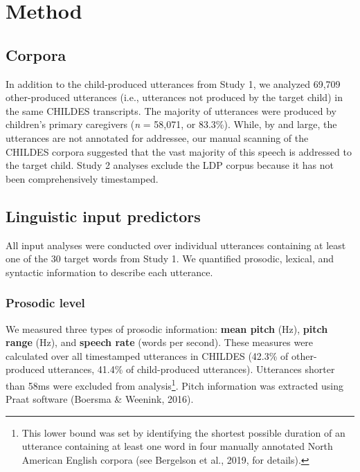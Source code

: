 \documentclass[10pt, letterpaper]{article}
\begin{document}
\vspace{\baselineskip} 
\vspace{\baselineskip}

\hypertarget{method-1}{%
\section{Method}\label{method-1}}

\hypertarget{corpora-1}{%
\subsection{Corpora}\label{corpora-1}}

In addition to the child-produced utterances from Study 1, we analyzed
69,709 other-produced utterances (i.e., utterances not produced by the
target child) in the same CHILDES transcripts. The majority of
utterances were produced by children's primary caregivers (\emph{n} =
58,071, or 83.3\%). While, by and large, the utterances are not
annotated for addressee, our manual scanning of the CHILDES corpora
suggested that the vast majority of this speech is addressed to the
target child. Study 2 analyses exclude the LDP corpus because it has not
been comprehensively timestamped.

\hypertarget{linguistic-input-predictors}{%
\subsection{Linguistic input
predictors}\label{linguistic-input-predictors}}

All input analyses were conducted over individual utterances containing
at least one of the 30 target words from Study 1. We quantified
prosodic, lexical, and syntactic information to describe each utterance.

\hypertarget{prosodic-level}{%
\subsubsection{Prosodic level}\label{prosodic-level}}

We measured three types of prosodic information: \textbf{mean pitch}
(Hz), \textbf{pitch range} (Hz), and \textbf{speech rate} (words per
second). These measures were calculated over all timestamped utterances
in CHILDES (42.3\% of other-produced utterances, 41.4\% of
child-produced utterances). Utterances shorter than 58ms were excluded
from analysis\footnote{This lower bound was set by identifying the
  shortest possible duration of an utterance containing at least one
  word in four manually annotated North American English corpora (see
  Bergelson et al., 2019, for details).}. Pitch information was
extracted using Praat software (Boersma \& Weenink, 2016).
\end{document}
